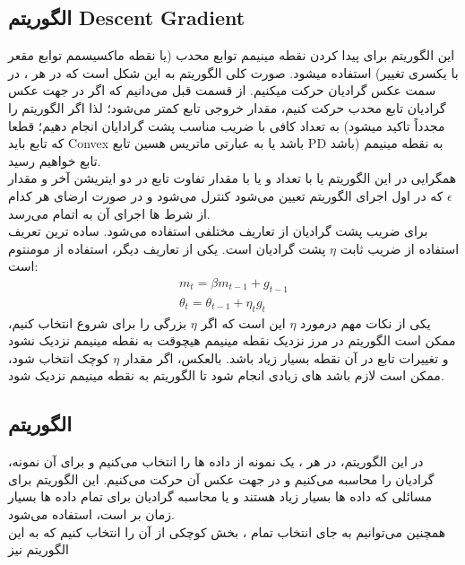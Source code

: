 \documentclass[fleqn]{article}
\theoremstyle{definition}
\begin{document}
\subsection{الگوریتم Descent Gradient }
این الگوریتم برای پیدا کردن نقطه مینیمم توابع محدب (یا نقطه ماکسیسمم توابع مقعر با یکسری تغییر) استفاده میشود. صورت کلی الگوریتم به این شکل است که در هر ، در سمت عکس گرادیان حرکت میکنیم. از قسمت قبل می‌دانیم که اگر در جهت عکس گرادیان تابع محدب حرکت کنیم، مقدار خروجی تابع کمتر می‌شود؛ لذا اگر الگوریتم را به تعداد کافی  با ضریب مناسب پشت گرادایان انجام دهیم؛ قطعا (مجدداً تاکید میشود که تابع باید Convex باشد یا به عبارتی ماتریس هسین تابع PD باشد) به نقطه مینیمم تابع خواهیم رسید.\\
همگرایی در این الگوریتم یا با تعداد  و یا با مقدار تفاوت تابع در دو ایتریشن آخر و مقدار $\epsilon$ که در اول اجرای الگوریتم تعیین می‌شود کنترل می‌شود و در صورت ارضای هر کدام از شرط ها اجرای آن به اتمام می‌رسد.\\
برای ضریب پشت گرادیان از تعاریف مختلفی استفاده می‌شود. ساده ترین تعریف استفاده از ضریب ثابت $\eta$ پشت گرادیان است. یکی از تعاریف دیگر، استفاده از مومنتوم است:
\begin{gather*}
    m_t = \beta m_{t-1} + g_{t-1} \\
    \theta_t = \theta_{t-1} + \eta_t g_{t}
\end{gather*}
یکی از نکات مهم درمورد $\eta$ این است که اگر $\eta$ بزرگی را برای شروع انتخاب کنیم، ممکن است الگوریتم در مرز نزدیک نقطه مینیمم هیچوقت به نقطه مینیمم نزدیک نشود و تغییرات تابع در آن نقطه بسیار زیاد باشد. بالعکس، اگر مقدار $\eta$ کوچک انتخاب شود، ممکن است لازم باشد  های زیادی انجام شود تا الگوریتم به نقطه مینیمم نزدیک شود.\\

\subsection{الگوریتم }
در این الگوریتم، در هر ، یک نمونه از داده ها را انتخاب می‌کنیم و برای آن نمونه، گرادیان را محاسبه می‌کنیم و در جهت عکس آن حرکت می‌کنیم. این الگوریتم برای مسائلی که داده ها بسیار زیاد هستند و یا محاسبه گرادیان برای تمام داده ها بسیار زمان بر است، استفاده می‌شود.\\
همچنین می‌توانیم به جای انتخاب تمام ، بخش کوچکی از آن را انتخاب کنیم که به این الگوریتم نیز


\clearpage
\end{document}
